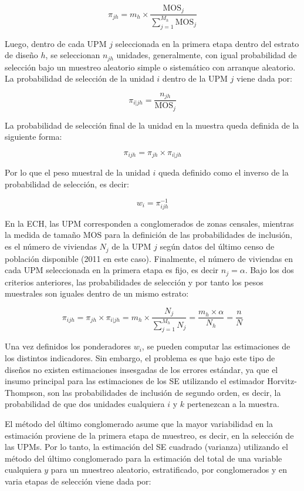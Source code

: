 \documentclass[12pt,twoside,spanish,a4paper]{book}\usepackage[]{graphicx}\usepackage[]{color}
\begin{document}
 \[  \pi_{jh}=m_h\times \frac{\text{MOS}_j}{\sum\limits_{j=1}^{M_h}\text{MOS}_j} \] 

Luego, dentro de cada UPM $j$ seleccionada en la primera etapa dentro del estrato de diseño $h$, se seleccionan $n_{jh}$ unidades, generalmente, con igual probabilidad de selección bajo un muestreo aleatorio simple o sistemático con arranque aleatorio. La probabilidad de selección de la unidad $i$ dentro de la UPM $j$ viene dada por:

\[ \pi_{i|jh}=\frac{n_{jh}}{\text{MOS}_{j}} \]

La probabilidad de selección final de la unidad en la muestra queda definida de la siguiente forma:

\[ \pi_{ijh}=\pi_{jh}\times \pi_{i|jh} \]

Por lo que el peso muestral de la unidad $i$ queda definido como el inverso de la probabilidad de selección, es decir:

\[ w_{i}=\pi_{ijh}^{-1} \]

En la ECH, las UPM corresponden a conglomerados de zonas censales, mientras la medida de tamaño MOS para la definición de las probabilidades de inclusión, es el número de viviendas $N_j$ de la UPM $j$ según datos del último censo de población disponible (2011 en este caso). Finalmente, el número de viviendas en cada UPM seleccionada en la primera etapa es fijo, es decir $n_j=\alpha$. Bajo los dos criterios anteriores, las probabilidades de selección y por tanto los pesos muestrales son iguales dentro de un mismo estrato:

\[ \pi_{ijh}=\pi_{jh}\times \pi_{i|jh}=m_h\times \frac{N_j}{\sum\limits_{j=1}^{M_h}N_j}=\frac{m_h\times \alpha}{N_h}=\frac{n}{N} \]

Una vez definidos los ponderadores $w_i$, se pueden computar las estimaciones de los distintos indicadores. Sin embargo, el problema es que bajo este tipo de diseños no existen estimaciones insesgadas de los errores estándar, ya que el insumo principal para las estimaciones de los SE utilizando el estimador Horvitz-Thompson, son las probabilidades de inclusión de segundo orden, es decir, la probabilidad de que dos unidades cualquiera $i$ y $k$ pertenezcan a la muestra.

El método del último conglomerado asume que la mayor variabilidad en la estimación proviene de la primera etapa de muestreo, es decir, en la selección de las UPMs. Por lo tanto, la estimación del SE cuadrado (varianza) utilizando el método del último conglomerado para la estimación del total de una variable cualquiera $y$ para un muestreo aleatorio, estratificado, por conglomerados y en varia etapas de selección viene dada por:
\end{document}
